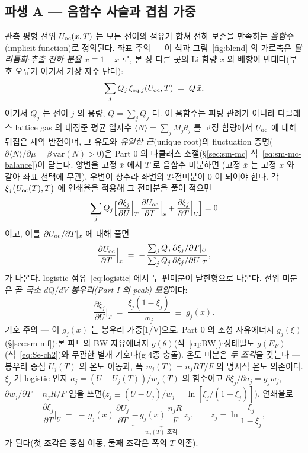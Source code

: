 \subsection{파생 A --- 음함수 사슬과 겹침 가중}\label{ssec:overlap}
관측 평형 전위 $U_{\mathrm{oc}}(x,T)$ 는 모든 전이의 점유가 합쳐 전하 보존을 만족하는 \emph{음함수}(implicit function)로 정의된다. 좌표 주의
--- 이 식과 그림~\ref{fig:blend} 의 가로축은 \emph{탈리튬화$\cdot$추출 전하 분율} $\bar x\equiv1-x$ 로, 본 장
다른 곳의 Li 함량 $x$ 와 배향이 반대다(부호 오류가 여기서 가장 자주 난다):
\begin{equation}
\sum_j Q_j\,\xi_{\mathrm{eq},j}(U_{\mathrm{oc}},T) \;=\; Q\,\bar x,
\label{eq:implicit}
\end{equation}
여기서 $Q_j$ 는 전이 $j$ 의 용량, $Q=\sum_j Q_j$ 다. 이 음함수는 피팅 관례가 아니라 다클래스 lattice gas 의
대정준 평균 입자수 $\langle N\rangle=\sum_jM_j\theta_j$ 를 고정 함량에서 $U_{\mathrm{oc}}$ 에 대해 뒤집은 제약
반전이며, 그 유도와 \emph{유일한 근}(unique root)의 fluctuation 증명($\partial\langle N\rangle/\partial\mu=\beta\,\mathrm{var}(N)>0$)은
Part 0 의 다클래스 소절(\S\ref{sec:sm-mc} 식~\eqref{eq:sm-mc-balance})이 닫는다. 양변을 고정 $\bar x$ 에서 $T$ 로 음함수 미분하면
(고정 $\bar x$ 는 고정 $x$ 와 같아 좌표 선택에 무관), 우변이 상수라 좌변의 $T$-전미분이 $0$ 이 되어야
한다. 각 $\xi_j\bigl(U_{\mathrm{oc}}(T),T\bigr)$ 에 연쇄율을 적용해 그 전미분을 풀어 적으면
\[
\sum_j Q_j\Big[\frac{\partial\xi_j}{\partial U}\Big|_T\,\frac{\partial U_{\mathrm{oc}}}{\partial T}\Big|_x
+\frac{\partial\xi_j}{\partial T}\Big|_U\Big]=0
\]
이고, 이를 $\partial U_{\mathrm{oc}}/\partial T|_x$ 에 대해 풀면
\begin{equation}
\frac{\partial U_{\mathrm{oc}}}{\partial T}\Big|_x
\;=\; -\,\frac{\sum_j Q_j\,\partial\xi_j/\partial T|_U}{\sum_j Q_j\,\partial\xi_j/\partial U|_T},
\label{eq:implicit_diff}
\end{equation}
가 나온다. logistic 점유~\eqref{eq:logistic} 에서 두 편미분이 닫힌형으로 나온다. 전위 미분은 곧 \emph{국소
$dQ/dV$ 봉우리(Part I 의 peak) 모양}이다:
\begin{equation}
\frac{\partial\xi_j}{\partial U}\Big|_T \;=\; \frac{\xi_j(1-\xi_j)}{w_j} \;\equiv\; g_j(x).
\label{eq:gj}
\end{equation}
기호 주의 --- 이 $g_j(x)$ 는 봉우리 가중[1/V]으로, Part 0 의 조성 자유에너지 $g_j(\xi)$(\S\ref{sec:sm-mf})$\cdot$본 파트의
BW 자유에너지 $g(\theta)$(식~\eqref{eq:BW})$\cdot$상태밀도 $g(E_F)$(식~\eqref{eq:Se-ch2})와 무관한 별개
기호다(g 4종 충돌). 온도 미분은 \emph{두 조각}을 갖는다 --- 봉우리 중심 $U_j(T)$ 의 온도 이동과,
폭 $w_j(T)=n_jRT/F$ 의 명시적 온도 의존이다. $\xi_j$ 가 logistic 인자 $a_j=(U-U_j(T))/w_j(T)$ 의 함수이고
$\partial\xi_j/\partial a_j=g_j w_j$, $\partial w_j/\partial T=n_jR/F$ 임을 쓰면($z_j\equiv(U-U_j)/w_j=\ln[\xi_j/
(1-\xi_j)]$), 연쇄율로
\begin{equation}
\frac{\partial\xi_j}{\partial T}\Big|_U
\;=\; -\,g_j(x)\,\frac{\partial U_j}{\partial T}
\;\underbrace{-\,g_j(x)\,\frac{n_jR}{F}\,z_j}_{w_j(T)\text{ 조각}},
\qquad z_j=\ln\frac{\xi_j}{1-\xi_j},
\label{eq:dxidT}
\end{equation}
가 된다(첫 조각은 중심 이동, 둘째 조각은 폭의 $T$-의존).


